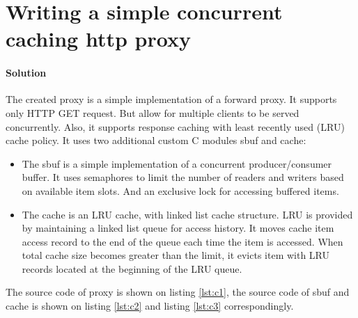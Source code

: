 \documentclass{article}
\newcommand\mylstcaption{}
\begin{document}
\section{Writing a simple concurrent caching http proxy}
\paragraph{Solution}
The created proxy is a simple implementation of a forward proxy.
It supports only HTTP GET request. But allow for multiple clients to be served concurrently.
Also, it supports response caching with least recently used (LRU) cache policy.
It uses two additional custom C modules \textsf{sbuf} and \textsf{cache}:
\begin{itemize}
    \item The \textsf{sbuf} is a simple implementation of a concurrent producer/consumer buffer.
It uses semaphores to limit the number of readers and writers based on available item slots.
And an exclusive lock for accessing buffered items.
    \item The \textsf{cache} is an LRU cache, with linked list cache structure.
LRU is provided by maintaining a linked list queue for access history.
It moves cache item access record to the end of the queue each time the item is accessed.
When total cache size becomes greater than the limit, 
it evicts item with LRU records located at the beginning of the LRU queue.
\end{itemize}
The source code of proxy is shown on listing \ref{lst:c1}, 
the source code of sbuf and cache is shown on listing \ref{lst:c2} 
and listing \ref{lst:c3} correspondingly.
\renewcommand\mylstcaption{proxy.c}
\begin{mdlisting}
    
\end{mdlisting}
\newpage
\renewcommand\mylstcaption{sbuf.c}
\begin{mdlisting}
    
\end{mdlisting}
\newpage
\renewcommand\mylstcaption{cache.c}
\begin{mdlisting}
    
\end{mdlisting}
\end{document}

